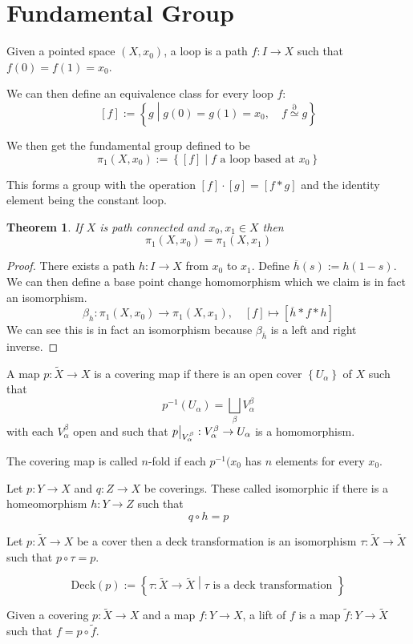 \documentclass[11pt]{article}
\newcommand{\defeq}{:=}
\newcommand{\homrel}{\stackrel{\partial}{\simeq}}
\newcommand\restr[2]{{%
  \left.\kern-\nulldelimiterspace %
  #1 %
  \vphantom{\big|} %
  \right|_{#2} %
  }}
\newcommand{\relmiddle}[1]{\mathrel{}\middle#1\mathrel{}}
\newcommand{\rmv}{\relmiddle|}
\newenvironment{defin}
	{\begin{mdframed}[backgroundcolor=white, roundcorner=5pt, linewidth=1pt]
		\setlength{\parindent}{0pt}
		}
	{\end{mdframed}}
\newcommand{\mdf}[1]{{\color{red} #1}}
\newtheorem{theorem}{Theorem}[section]
\begin{document}
\section{Fundamental Group}
\begin{defin}
	Given a pointed space $(X,x_0)$, a \mdf{loop} is a path $f:I \to X$ such that $f(0)=f(1)=x_0$.	

	We can then define an equivalence class for every loop $f$:
	\[
		[f]\defeq\left\{g \rmv g(0)=g(1)=x_0,\quad f\homrel g \right\}
	\]
	
	We then get the \mdf{fundamental group} defined to be
	\[
		\pi_1(X,x_0)\defeq\left\{[f] \rmv f \text{ a loop based at } x_0 \right\}
	\]

	This forms a group with the operation $[f]\cdot [g]=[f\ast g]$ and the identity element being the constant loop.
\end{defin}

\begin{theorem}
If $X$ is path connected and $x_0,x_1\in X$ then
\[
	\pi_1(X,x_0)=\pi_1(X,x_1)
\]
\end{theorem}

\begin{proof}
There exists a path $h:I\to X$ from $x_0$ to $x_1$.
Define $\overline{h}(s)\defeq h(1-s)$.
We can then define a base point change homomorphism which we claim is in fact an isomorphism.
\[
	\beta_h:\pi_1(X,x_0)\to\pi_1(X,x_1), \quad [f]\mapsto [\overline{h}\ast f \ast h]
\]
We can see this is in fact an isomorphism because $\beta_{\overline{h}}$ is a left and right inverse.
\end{proof}

\begin{defin}
	A map $p:\widetilde{X}\to X$ is a \mdf{covering map} if there is an open cover $\left\{U_\alpha\right\}$ of $X$ such that
	\[
		p^{-1}(U_\alpha)=\bigsqcup_\beta V_\alpha^\beta
	\]
	with each $V_\alpha^\beta$ open and such that $\restr{p}{V_\alpha^\beta}:V_\alpha^\beta\to U_\alpha$ is a homomorphism.

	The covering map is called \mdf{$n$-fold} if each $p^{-1}(x_0$ has $n$ elements for every $x_0$.

	Let $p:Y\to X$ and $q:Z\to X$ be coverings. These called \mdf{isomorphic} if there is a homeomorphism $h:Y\to Z$ such that
	\[
		q \circ h = p
	\]

	Let $p:\widetilde{X}\to X$ be a cover then a \mdf{deck transformation} is an isomorphism $\tau:\widetilde{X}\to\widetilde{X}$ such that $p\circ\tau=p$.

	\[
		\text{Deck}(p)\defeq\left\{\tau:\widetilde{X}\to\widetilde{X}\rmv\tau\text{ is a deck transformation }\right\}
	\]

	Given a covering $p:\widetilde{X}\to X$ and a map $f:Y\to X$, a \mdf{lift} of $f$ is a map $\widetilde{f}:Y\to\widetilde{X}$ such that $f=p\circ\widetilde{f}$.
\end{defin}
\end{document}

